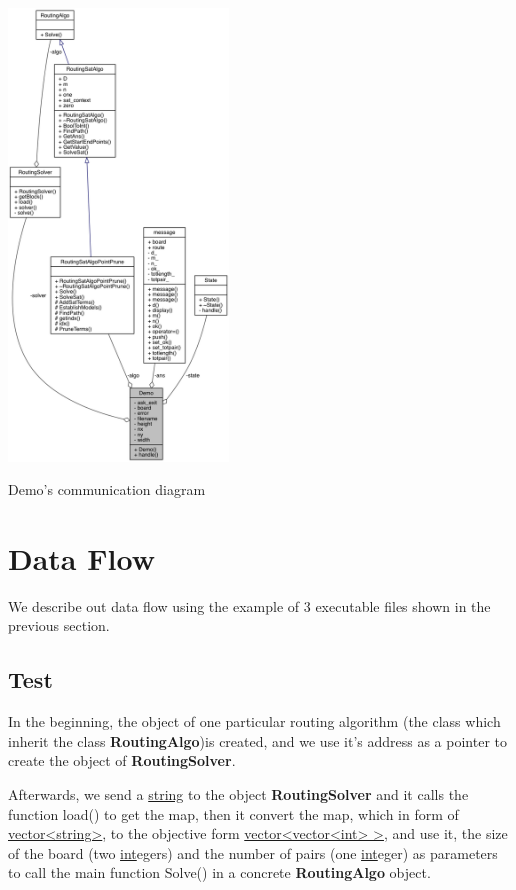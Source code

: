 \documentclass[twocolumn]{article}
\begin{document}
\begin{center}
\makeatletter
\def\@captype{figure}
\makeatother
\includegraphics [height=12cm]{UMLDemo}
\caption{Demo's communication diagram}
\label{UMLDemo}
\end{center}

\section{Data Flow}

We describe out data flow using the example of 3 executable files shown in the previous section.

\subsection{Test}

In the beginning, the object of one particular routing algorithm (the class which inherit the class \textbf{RoutingAlgo})is created, and we use it's address as a pointer to create the object of \textbf{RoutingSolver}.

Afterwards, we send a \underline{string} to the object \textbf{RoutingSolver} and it calls the function load() to get the map, then it convert the map, which in form of \underline{vector<string>}, to the objective form \underline{vector<vector<int> >}, and use it, the size of the board (two \underline{int}egers) and the number of pairs (one \underline{int}eger) as parameters to call the main function Solve() in a concrete \textbf{RoutingAlgo} object.
\end{document}
